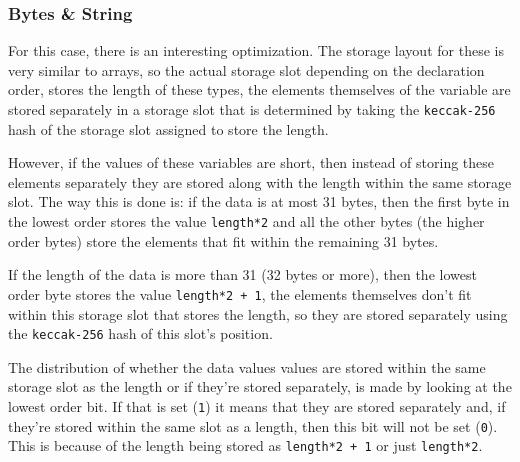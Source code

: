 \subsubsection{Bytes \& String}\label{bytes-string}

For this case, there is an interesting optimization. The storage layout
for these is very similar to arrays, so the actual storage slot
depending on the declaration order, stores the length of these types,
the elements themselves of the variable are stored separately in a
storage slot that is determined by taking the \texttt{keccak-256} hash
of the storage slot assigned to store the length.

However, if the values of these variables are short, then instead of
storing these elements separately they are stored along with the length
within the same storage slot. The way this is done is: if the data is at
most 31 bytes, then the first byte in the lowest order stores the value
\texttt{length*2} and all the other bytes (the higher order bytes) store
the elements that fit within the remaining 31 bytes.

If the length of the data is more than 31 (32 bytes or more), then the
lowest order byte stores the value \texttt{length*2\ +\ 1}, the elements
themselves don't fit within this storage slot that stores the length, so
they are stored separately using the \texttt{keccak-256} hash of this
slot's position.

The distribution of whether the data values values are stored within the
same storage slot as the length or if they're stored separately, is made
by looking at the lowest order bit. If that is set (\texttt{1}) it means
that they are stored separately and, if they're stored within the same
slot as a length, then this bit will not be set (\texttt{0}). This is
because of the length being stored as \texttt{length*2\ +\ 1} or just
\texttt{length*2}.

